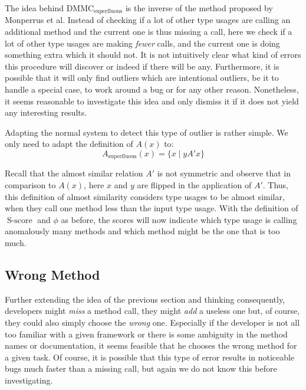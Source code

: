 The idea behind $\text{DMMC}_{\text{superfluous}}$ is the inverse of the method proposed by Monperrus et al.
Instead of checking if a lot of other type usages are calling an additional method and the current one is thus missing a call, here we check if a lot of other type usages are making \emph{fewer} calls, and the current one is doing something extra which it should not.
It is not intuitively clear what kind of errors this procedure will discover or indeed if there will be any.
Furthermore, it is possible that it will only find outliers which are intentional outliers, be it to handle a special case, to work around a bug or for any other reason.
Nonetheless, it seems reasonable to investigate this idea and only dismiss it if it does not yield any interesting results.

Adapting the normal system to detect this type of outlier is rather simple.
We only need to adapt the definition of $A(x)$ to:
\begin{equation*}
    A_{\text{superfluous}}(x) = \{x \mid yA'x \}
\end{equation*}

Recall that the almost similar relation $A'$ is not symmetric and observe that in comparison to $A(x)$, here $x$ and $y$ are flipped in the application of $A'$. 
Thus, this definition of almost similarity considers type usages to be almost similar, when they call one method less than the input type usage.
With the definition of $\operatorname{S-score}$ and $\phi$ as before, the scores will now indicate which type usage is calling anomalously many methods and which method might be the one that is too much.

\subsection{Wrong Method}

Further extending the idea of the previous section and thinking consequently, developers might \emph{miss} a method call, they might \emph{add} a useless one but, of course, they could also simply choose the \emph{wrong} one.
Especially if the developer is not all too familiar with a given framework or there is some ambiguity in the method names or documentation, it seems feasible that he chooses the wrong method for a given task.
Of course, it is possible that this type of error results in noticeable bugs much faster than a missing call, but again we do not know this before investigating.

